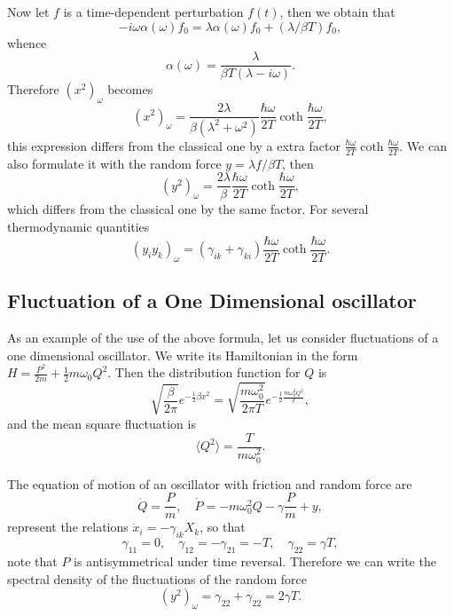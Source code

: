 \documentclass{book}
\newcommand{\average}[1]{\langle#1\rangle}
\numberwithin{equation}{section}
\begin{document}
Now let $f$ is a time-dependent perturbation $f(t)$, then we obtain that
\begin{equation}
  -i\omega\alpha(\omega)f_0=\lambda\alpha(\omega)f_0+(\lambda/\beta T)f_0,
\end{equation}
whence 
\begin{equation}
  \alpha(\omega)=\frac{\lambda}{\beta T(\lambda-i\omega)}.
\end{equation}
Therefore $(x^2)_\omega$ becomes
\begin{equation}
  (x^2)_\omega=\frac{2\lambda}{\beta(\lambda^2+\omega^2)}
  \frac{\hbar\omega}{2T}\coth\frac{\hbar\omega}{2T},
\end{equation}
this expression differs from the classical one by a extra factor
$\frac{\hbar\omega}{2T}\coth\frac{\hbar\omega}{2T}$. 
We can also formulate it with the random force $y=\lambda f/\beta T$, then 
\begin{equation}
  (y^2)_\omega=\frac{2\lambda}{\beta}\frac{\hbar\omega}{2T}
  \coth\frac{\hbar\omega}{2T},
\end{equation}
which differs from the classical one by the same factor. For several
thermodynamic quantities
\begin{equation}
  (y_iy_k)_\omega=(\gamma_{ik}+\gamma_{ki})\frac{\hbar\omega}{2T}
  \coth\frac{\hbar\omega}{2T}.
\end{equation}

\subsection{Fluctuation of a One Dimensional oscillator}
As an example of the use of the above formula, let us consider
fluctuations of a one dimensional oscillator. We write its Hamiltonian
in the form $H=\frac{P^2}{2m}+\frac{1}{2}m\omega_0Q^2$. Then the distribution
function for $Q$ is
\begin{equation}
  \sqrt{\frac{\beta}{2\pi}}e^{-\frac{1}{2}\beta x^2}=
  \sqrt{\frac{m\omega_0^2}{2\pi T}}e^{-\frac{1}{2}\frac{m\omega_0^2Q^2}{T}},
\end{equation}
and the mean square fluctuation is
\begin{equation}
  \average{Q^2}=\frac{T}{m\omega_0^2}.
\end{equation}

The equation of motion of an oscillator with friction and random force are
\begin{equation}
  \dot{Q}=\frac{P}{m},\quad \dot{P}=-m\omega_0^2Q-\gamma\frac{P}{m}+y,
\end{equation}
represent the relations $\dot{x}_i=-\gamma_{ik}X_k$, so that
\begin{equation}
  \gamma_{11}=0,\quad \gamma_{12}=-\gamma_{21}=-T,\quad\gamma_{22}=\gamma T,
\end{equation}
note that $P$ is antisymmetrical under time reversal.  Therefore we
can write the spectral density of the fluctuations of the random force
\begin{equation}
  (y^2)_\omega=\gamma_{22}+\gamma_{22}=2\gamma T.
\end{equation}
\end{document}
